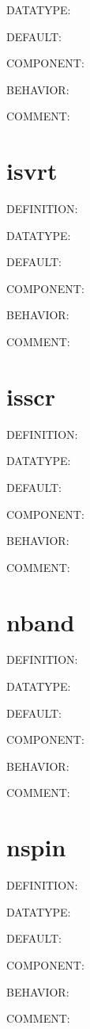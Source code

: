 {\color{green}DATATYPE:}

{\color{blue}DEFAULT:}

{\color{brown}COMPONENT:}

{\color{purple}BEHAVIOR:}

{\color{olive}COMMENT:}

\section{isvrt}
{\color{red}DEFINITION:}

{\color{green}DATATYPE:}

{\color{blue}DEFAULT:}

{\color{brown}COMPONENT:}

{\color{purple}BEHAVIOR:}

{\color{olive}COMMENT:}

\section{isscr}
{\color{red}DEFINITION:}

{\color{green}DATATYPE:}

{\color{blue}DEFAULT:}

{\color{brown}COMPONENT:}

{\color{purple}BEHAVIOR:}

{\color{olive}COMMENT:}

\section{nband}
{\color{red}DEFINITION:}

{\color{green}DATATYPE:}

{\color{blue}DEFAULT:}

{\color{brown}COMPONENT:}

{\color{purple}BEHAVIOR:}

{\color{olive}COMMENT:}

\section{nspin}
{\color{red}DEFINITION:}

{\color{green}DATATYPE:}

{\color{blue}DEFAULT:}

{\color{brown}COMPONENT:}

{\color{purple}BEHAVIOR:}

{\color{olive}COMMENT:}

